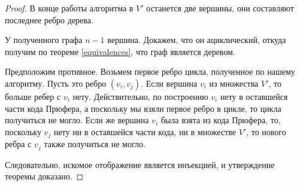 \begin{proof}
	 	В конце работы алгоритма в $V'$ останется две вершины, они составляют последнее ребро дерева.
	 	
	 	У полученного графа $n-1$ вершина. Докажем, что он ациклический, откуда получим по теореме \ref{equivalences}, что граф является деревом.
	 	
	 	Предположим противное. Возьмем первое ребро цикла, полученное по нашему алгоритму. Пусть это ребро $\left(v_i, v_j \right)$. Если вершина $v_i$ из множества $V'$, то больше ребер с $v_i$ нету. Действительно, по построению $v_i$ нету в оставшейся части кода Прюфера, а поскольку мы взяли первое ребро в цикле, то цикла получиться не могло. Если же вершина $v_i$ была взята из кода Прюфера, то, поскольку $v_j$ нету ни в оставшейся части кода, ни в множестве $V'$, то нового ребра с $v_j$ также получиться не могло.
	 	
	 Следовательно, искомое отображение является инъекцией, и утверждение теоремы доказано.
\end{proof}
